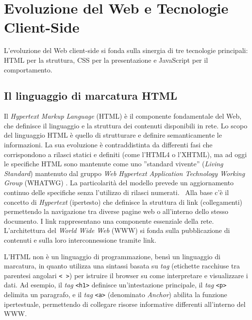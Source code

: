 \section{Evoluzione del Web e Tecnologie Client-Side}
L'evoluzione del Web client-side si fonda sulla sinergia di tre tecnologie principali: HTML per la struttura, CSS per la presentazione e JavaScript per il comportamento. 

\subsection{Il linguaggio di marcatura HTML}
Il \textit{Hypertext Markup Language} (HTML) è il componente fondamentale del Web, che definisce il linguaggio e la struttura dei contenuti disponibili in rete. Lo scopo del linguaggio HTML è quello di strutturare e definire semanticamente le informazioni. La sua evoluzione è contraddistinta da differenti fasi che corrispondono a rilasci statici e definiti (come l'HTML4 o l'XHTML), ma ad oggi le specifiche HTML sono mantenute come uno ''standard vivente'' (\textit{Living Standard}) mantenuto dal gruppo \textit{Web Hypertext Application Technology Working Group} (WHATWG) . La particolarità del modello prevede un aggiornamento continuo delle specifiche senza l'utilizzo di rilasci numerati.~\cite{HTMLStandard} Alla base c’è il concetto di \textit{Hypertext} (ipertesto) che definisce la struttura di link (collegamenti) permettendo la navigazione tra diverse pagine web o all'interno dello stesso documento. I link rappresentano una componente essenziale della rete.  L'architettura del \textit{World Wide Web} (WWW) si fonda sulla pubblicazione di contenuti e sulla loro interconnessione tramite link.

L'HTML non è un linguaggio di programmazione, bensì un linguaggio di marcatura, in quanto utilizza una sintassi basata su \textit{tag} (etichette racchiuse tra parentesi angolari \texttt{< >}) per istruire il browser su come interpretare e visualizzare i dati. Ad esempio, il \textit{tag} \texttt{<h1>} definisce un'intestazione principale, il \textit{tag} \texttt{<p>} delimita un paragrafo, e il \textit{tag} \texttt{<a>} (denominato \textit{Anchor}) abilita la funzione ipertestuale, permettendo di collegare risorse informative differenti all'interno del WWW.


